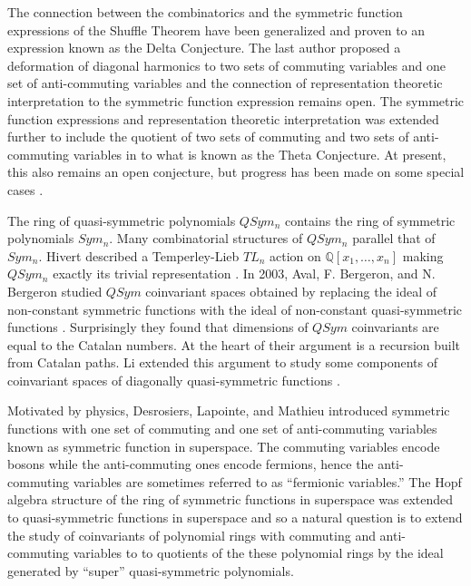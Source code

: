 \documentclass[11pt]{amsart}
\theoremstyle{definition}
\numberwithin{equation}{section}
\begin{document}
The connection between the combinatorics and the symmetric function expressions of the Shuffle Theorem have been generalized \cite{HRW} and proven \cite{DM} to an expression known as the Delta Conjecture.  The last author \cite{Z} proposed a deformation of diagonal harmonics to two sets of commuting variables and one set of anti-commuting variables and the connection of representation theoretic interpretation to the symmetric function expression remains open.  The symmetric function expressions and representation theoretic interpretation was extended further to include the quotient of two sets of commuting and two sets of anti-commuting variables in \cite{DIW} to what is known as the Theta Conjecture.  At present, this also remains an open conjecture, but progress has been made on some special cases \cite{IRR, KR, SW, SW2}.

The ring of quasi-symmetric polynomials $QSym_{n}$ contains the ring of symmetric polynomials $Sym_{n}$.  Many combinatorial structures of $QSym_{n}$ parallel that of $Sym_{n}$.  Hivert described a Temperley-Lieb $TL_{n}$ action on $\mathbb{Q}[x_{1},\dots,x_{n}]$ making $QSym_{n}$ exactly its trivial representation \cite{Hi}.  In 2003, Aval, F. Bergeron, and N. Bergeron studied $QSym$ coinvariant spaces obtained by replacing the ideal of non-constant symmetric functions with the ideal of non-constant quasi-symmetric functions \cite{AB,ABB}.  Surprisingly they found that dimensions of $QSym$ coinvariants are equal to the Catalan numbers.  At the heart of their argument is a recursion built from Catalan paths.  Li extended this argument to study some components of coinvariant spaces of diagonally quasi-symmetric functions \cite{L}.

Motivated by physics, Desrosiers, Lapointe, and Mathieu \cite{DLM,DLM2} introduced symmetric functions with one set of commuting and one set of anti-commuting variables known as symmetric function in superspace.
The commuting variables encode bosons while the anti-commuting ones encode fermions, hence the anti-commuting variables are sometimes referred to as ``fermionic variables.''  The Hopf algebra structure of the ring of symmetric functions in superspace was extended to quasi-symmetric functions in superspace \cite{FLP} and so a natural question is to extend the study of coinvariants of polynomial rings with commuting and anti-commuting variables to to quotients of the these polynomial rings by the ideal generated by ``super'' quasi-symmetric polynomials.
\end{document}
